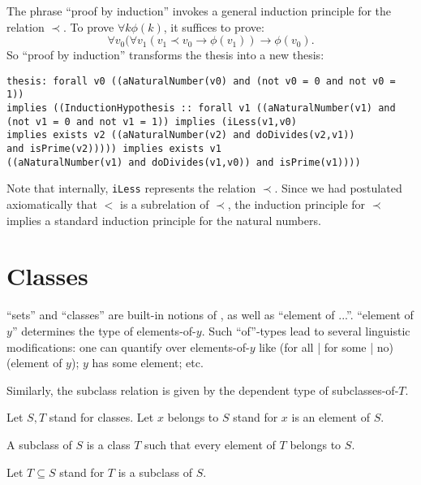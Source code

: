 \documentclass[11pt]{article}
\begin{document}
The phrase ``proof by induction'' invokes a general induction principle
for the relation $\prec$. To prove $\forall k \phi(k)$, it suffices to
prove:
$$\forall v_0 (\forall v_1 (v_1 \prec v_0 \rightarrow \phi(v_1))
\rightarrow \phi(v_0).$$
So ``proof by induction'' transforms the thesis into a new thesis:
\begin{footnotesize}
\begin{verbatim}
thesis: forall v0 ((aNaturalNumber(v0) and (not v0 = 0 and not v0 = 1)) 
implies ((InductionHypothesis :: forall v1 ((aNaturalNumber(v1) and 
(not v1 = 0 and not v1 = 1)) implies (iLess(v1,v0) 
implies exists v2 ((aNaturalNumber(v2) and doDivides(v2,v1)) 
and isPrime(v2))))) implies exists v1 
((aNaturalNumber(v1) and doDivides(v1,v0)) and isPrime(v1))))
\end{verbatim}
\end{footnotesize}
Note that internally,
\verb+iLess+ represents the relation $\prec$. Since we had postulated
axiomatically that $<$ is a subrelation of $\prec$, the induction principle
for $\prec$ implies a standard induction principle for the natural numbers. 

\section{Classes}

``sets'' and ``classes'' are built-in notions of 
\Naproche{}, as well as ``element of ...''.
``element of
$y$'' determines the type of
elements-of-$y$. Such ``of''-types lead to several 
linguistic modifications: one can quantify over
elements-of-$y$ like (for all | for some | no) (element of $y$);
$y$ has some element; etc.

Similarly, the subclass relation is given by the dependent
type of subclasses-of-$T$.

\begin{forthel}

Let $S,T$ stand for classes.
Let $x$ belongs to $S$ stand 
for $x$ is an element of $S$.

\begin{definition} A subclass of $S$ is a class $T$ 
such that every element of $T$ belongs to $S$.
\end{definition}

Let $T \subseteq S$ stand for $T$ is a subclass of $S$.
\end{forthel}
\end{document}
